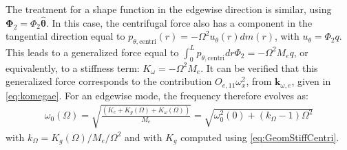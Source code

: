 \documentclass[wes, manuscript]{copernicus}
\renewcommand{\v}[1]{\boldsymbol{#1}}
\begin{document}
The treatment for a shape function in the edgewise direction is similar, using $\v{\Phi}_2=\Phi_2 \v{\hat{\theta}}$.
In this case, the centrifugal force also has a component in the tangential direction equal to $p_{\theta,\text{centri}}(r) = -\Omega^2u_\theta(r) dm(r)$, with $u_\theta=\Phi_2 q$. 
This leads to a generalized force equal to $\int_0^L p_{\theta,\text{centri}} dr \Phi_2=-\Omega^2 M_{e} q$, or equivalently, to a stiffness term: $K_{\omega}=-\Omega^2 M_{e}$.
It can be verified that this generalized force corresponds to the contribution $O_{e,11}\omega_x^2$, from $\v{k}_{\omega,e}$, given in \autoref{eq:komegae}.
For an edgewise mode, the frequency therefore evolves as: 
\begin{align}
 \omega_0(\Omega)=\sqrt{\frac{(K_{e}+ K_g(\Omega)+K_\omega(\Omega))}{M_e}}=\sqrt{\omega_0^2(0)+(k_\Omega-1)\Omega^2}
\end{align}
 with $k_\Omega=K_g(\Omega)/M_e/\Omega^2$ and with $K_g$ computed using \autoref{eq:GeomStiffCentri}.
\end{document}
